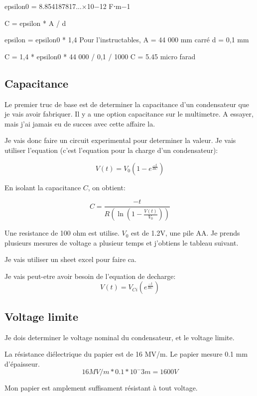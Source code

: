 \documentclass[12 pt, a4paper]{report} %
\begin{document}
epsilon0 = 8.854187817...×10−12 F⋅m−1

C = epsilon * A / d

epsilon = epsilon0 * 1,4
Pour l'instructables, A = 44 000 mm carré
d = 0,1 mm

C = 1,4 * epsilon0 * 44 000 / 0,1 / 1000
C = 5.45 micro farad

\subsection{Capacitance}
Le premier truc de base est de determiner la capacitance d'un condensateur que je vais avoir fabriquer. Il y a une option capacitance sur le multimetre. A essayer, mais j'ai jamais eu de succes avec cette affaire la.

Je vais donc faire un circuit experimental pour determiner la valeur. Je vais utiliser l'equation (c'est l'equation pour la charge d'un condensateur):

\begin{equation}
V(t)=V_{0}(1 - e^{\frac{-t}{RC}})
\end{equation}

En isolant la capacitance $C$, on obtient:

\begin{equation}
C=\frac{-t}{R(\ln(1-\frac{V(t)}{V_{0}}))}
\end{equation}

Une resistance de 100 ohm est utilise. $V_{0}$ est de 1.2V, une pile AA. Je prends plusieurs mesures de voltage a plusieur temps et j'obtiens le tableau suivant.

Je vais utiliser un sheet excel pour faire ca.

Je vais peut-etre avoir besoin de l'equation de decharge:
\begin{equation}
V(t)=V_{Ci}(e^{\frac{-t}{RC}})
\end{equation}

\subsection{Voltage limite}

Je dois determiner le voltage nominal du condensateur, et le voltage limite.

La résistance diélectrique du papier est de 16 MV/m.
Le papier mesure 0.1 mm d'épaisseur.
\[16 MV/m * 0.1 * 10^-3 m = 1600 V\]

Mon papier est amplement suffisament résistant à tout voltage.
\end{document}
